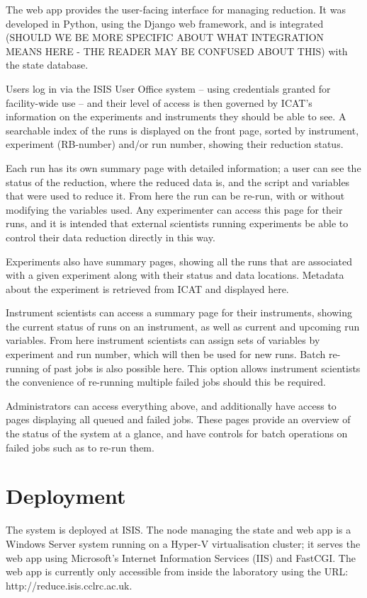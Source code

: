 \documentclass[twocolumn]{article}
\begin{document}
The web app provides the user-facing interface for managing reduction.
It was developed in Python, using the Django web framework, and is
integrated (SHOULD WE BE MORE SPECIFIC ABOUT WHAT INTEGRATION
MEANS HERE - THE READER MAY BE CONFUSED ABOUT THIS) with the state database.

Users log in via the ISIS User Office system -- using credentials 
granted for facility-wide use -- and their level of access is then 
governed by ICAT's information on the experiments and instruments they 
should be able to see. A searchable index of the runs is displayed on the front page, sorted
by instrument, experiment (RB-number) and/or run number, showing their reduction
status.

Each run has its own summary page with detailed information; a user can
see the status of the reduction, where the reduced data is, and the
script and variables that were used to reduce it. From here the run can
be re-run, with or without modifying the variables used. Any
experimenter can access this page for their runs, and it is intended that
external scientists running experiments be able to control their data
reduction directly in this way.

Experiments also have summary pages, showing all the runs that are
associated with a given experiment along with their status and data
locations. Metadata about the experiment is retrieved from ICAT and
displayed here.

Instrument scientists can access a summary page for their instruments,
showing the current status of runs on an instrument, as well as current
and upcoming run variables. From here instrument scientists can assign
sets of variables by experiment and run number, which will then be used
for new runs. Batch re-running of past jobs
is also possible here. This option allows instrument scientists
the convenience of re-running multiple failed jobs should this be required. 

Administrators can access everything above, and additionally have access
to pages displaying all queued and failed jobs. These pages provide an
overview of the status of the system at a glance, and have controls for
batch operations on failed jobs such as to re-run them.

\section{Deployment}\label{deployment}

The system is deployed at ISIS. The node managing
the state and web app is a Windows Server system running on a 
Hyper-V\cite{hyper-v} virtualisation cluster; it serves the web app using
Microsoft's Internet Information Services (IIS)\cite{iis} and 
FastCGI\cite{fcgi}. The web app is currently only accessible from inside
the laboratory using the URL: http://reduce.isis.cclrc.ac.uk. 
\end{document}

